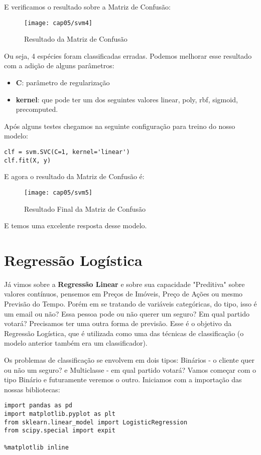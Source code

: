 E verificamos o resultado sobre a Matriz de Confusão:
\begin{figure}[H]
	\centering
	\texttt{[image: cap05/svm4]}
	\caption{Resultado da Matriz de Confusão}
\end{figure}

Ou seja, 4 espécies foram classificadas erradas. Podemos melhorar esse resultado com a adição de alguns parâmetros:
\begin{itemize}[nolistsep]
	\item \textbf{C}: parâmetro de regularização
	\item \textbf{kernel}: que pode ter um dos seguintes valores linear, poly, rbf, sigmoid, precomputed.
\end{itemize}
	
Após alguns testes chegamos na seguinte configuração para treino do nosso modelo:
\begin{lstlisting}[]
clf = svm.SVC(C=1, kernel='linear')
clf.fit(X, y)
\end{lstlisting}

E agora o resultado da Matriz de Confusão é:
\begin{figure}[H]
	\centering
	\texttt{[image: cap05/svm5]}
	\caption{Resultado Final da Matriz de Confusão}
\end{figure}

E temos uma excelente resposta desse modelo.

\section{Regressão Logística}
Já vimos sobre a \textbf{Regressão Linear} e sobre sua capacidade "Preditiva" sobre valores contínuos, pensemos em Preços de Imóveis, Preço de Ações ou mesmo Previsão do Tempo. Porém em se tratando de variáveis categóricas, do tipo, isso é um email ou não? Essa pessoa pode ou não querer um seguro? Em qual partido votará? Precisamos ter uma outra forma de previsão. Esse é o objetivo da Regressão Logística, que é utilizada como uma das técnicas de classificação (o modelo anterior também era um classificador).

Os problemas de classificação se envolvem em dois tipos: Binários - o cliente quer ou não um seguro? e Multiclasse - em qual partido votará? Vamos começar com o tipo Binário e futuramente veremos o outro. Iniciamos com a importação das nossas bibliotecas:
\begin{lstlisting}[]
import pandas as pd
import matplotlib.pyplot as plt
from sklearn.linear_model import LogisticRegression
from scipy.special import expit

%matplotlib inline
\end{lstlisting}

